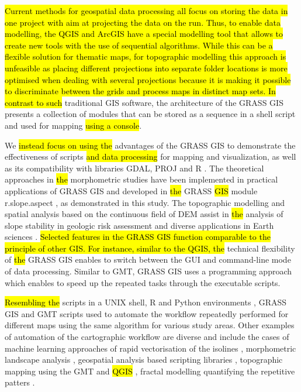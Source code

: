 \documentclass[technologies,article,submit,pdftex,moreauthors]{Definitions/mdpi}
\begin{document}
\hl{Current methods for geospatial data processing all focus on storing the data in one project with aim at projecting the data on the run. Thus, to enable data modelling, the QGIS and ArcGIS have a special modelling tool that allows to create new tools with the use of sequential algorithms. While this can be a flexible solution for thematic maps, for topographic modelling this approach is unfeasible as placing different projections into separate folder locations is more optimised when dealing with several projections because it is making it possible to discriminate between the grids and process maps in distinct map sets. In contrast to such} traditional GIS software, the architecture of the GRASS GIS presents a collection of modules that can be stored as a sequence in a shell script and used for mapping \hl{using a console}. 

We \hl{instead focus on using the} advantages of the GRASS GIS to demonstrate the effectiveness of scripts \hl{and data processing }for mapping and visualization, as well as its compatibility with libraries\hl{ }GDAL, PROJ and R \cite{Bivand2000,Bivand1999,app122412554,Grohmann}. The theoretical approaches in \hl{the }morphometric studies \cite{Chapman} have been implemented in practical applications of GRASS GIS and developed in \hl{the }GRASS \hl{GIS} module r.slope.aspect \cite{Hofierka2009}, as demonstrated in this study. The topographic modelling and spatial analysis based on the continuous field of DEM assist in \hl{the }analysis of slope stability in geologic risk assessment and diverse applications in Earth sciences \cite{HofierkaSuri,Mitas1999,Mitasovaetal1996}. \hl{Selected features in the GRASS GIS function comparable to the principle of other GIS. For instance, similar to the QGIS, the }technical flexibility of \hl{the }GRASS GIS enables to switch between the GUI and command-line mode of data processing. Similar to GMT, GRASS GIS uses a programming approach which enables to speed up the repeated tasks through the executable scripts. 

\hl{Resembling the} scripts in a UNIX shell, R and Python environments \cite{jimaging8120317}, GRASS GIS and GMT scripts\hl{ }used to automate the workflow repeatedly performed for different maps using the same algorithm for various study areas. Other examples of automation of the cartographic workflow are diverse and include the cases of machine learning approaches of rapid vectorisation of the isolines \cite{Lemenkova2020e}, morphometric landscape analysis \cite{Clarke,Sofia}, geospatial analysis based scripting libraries \cite{su142315966}, topographic mapping using the GMT and \hl{QGIS} \cite{LemenkovaDebeir2022JAES}, fractal modelling quantifying the repetitive patters \cite{Malinverno}.
\end{document}
